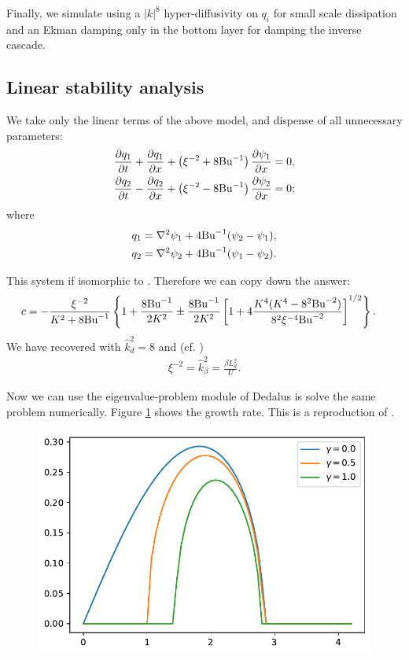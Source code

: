 Finally, we simulate using a $|k|^8$ hyper-diffusivity on $q_i$ for small scale dissipation and an Ekman damping only in the bottom layer for damping the inverse cascade.

\subsection{Linear stability analysis}
We take only the linear terms of the above model, and dispense of all unnecessary parameters:
\begin{align}
    &\frac{\partial q_1}{\partial t}+\frac{\partial q_1}{\partial x}+\left(\xi^{-2}+8\text{Bu}^{-1}\right)\frac{\partial\psi_1}{\partial x} = 0,\label{eq:2lay_sym_eq1_lin}\\
    &\frac{\partial q_2}{\partial t}-\frac{\partial q_2}{\partial x}+\left(\xi^{-2}-8\text{Bu}^{-1}\right)\frac{\partial\psi_2}{\partial x} = 0;\label{eq:2lay_sym_eq2_lin}
\end{align}
where
\begin{align}
    q_1 &= \nabla^2\psi_1 + 4\text{Bu}^{-1}(\psi_2-\psi_1),\label{eq:2lay_sym_pv1_lin}\\
    q_2 &= \nabla^2\psi_2 + 4\text{Bu}^{-1}(\psi_1-\psi_2).\label{eq:2lay_sym_pv2_lin}
\end{align}

This system if isomorphic to \cite[(9.107)]{Vallis_17}. Therefore we can copy down the answer:
\begin{align}
    c &= -\frac{\xi^{-2}}{K^2+8\text{Bu}^{-1}}\left\{ 1+\frac{8\text{Bu}^{-1}}{2K^2}\pm\frac{8\text{Bu}^{-1}}{2K^2}\left[1+4\frac{K^4(K^4-8^2\text{Bu}^{-2})}{8^2\xi^{-4}\text{Bu}^{-2}}\right]^{1/2} \right\}.
\end{align}
We have recovered \cite[(9.114)]{Vallis_17} with $\hat{k}_d^2 = 8$ and (cf. \cite[(9.115)]{Vallis_17})
\begin{align}
    \xi^{-2} = \hat{k}_\beta^2 = \frac{\beta L_d^2}{U}.
\end{align}

Now we can use the eigenvalue-problem module of Dedalus is solve the same problem numerically. Figure \ref{fig:2Lay_linstab} shows the growth rate. This is a reproduction of \cite[Fig. 9.14]{Vallis_17}.
\begin{figure}
    \centering
    \includegraphics[width=\textwidth]{2Lay_linstab}
    \caption{}
    \label{fig:2Lay_linstab}
\end{figure}


